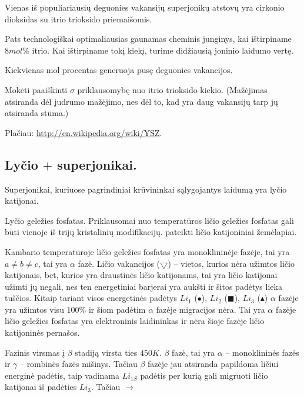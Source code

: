 \begin{remember}
  \item Vienas iš populiariausių deguonies vakansijų superjonikų
    atstovų yra cirkonio dioksidas su itrio trioksido priemaišomis.
  \item Pats technologiškai optimaliausias gaunamas cheminis
    junginys, kai ištirpiname $8 mol \%$ itrio. Kai ištirpiname tokį
    kiekį, turime didžiausią joninio laidumo vertę.
  \item Kiekvienas mol procentas generuoja pusę deguonies vakancijos.
  \item Mokėti paaiškinti $\sigma$ priklausomybę nuo itrio trioksido
    kiekio. (Mažėjimas atsiranda dėl judrumo mažėjimo, nes dėl
    to, kad yra daug vakansijų tarp jų atsiranda stūma.)
\end{remember}

Plačiau: \url{http://en.wikipedia.org/wiki/YSZ}.

\subsection{Lyčio $+$ superjonikai.}

Superjonikai, kuriuose pagrindiniai krūvininkai sąlygojantys laidumą
yra lyčio katijonai.

Lyčio geležies fosfatas. Priklausomai nuo temperatūros ličio geležies
fosfatas gali būti vienoje iš trijų kristalinių modifikacijų.
 pateikti ličio katijoniniai žemėlapiai.

Kambario temperatūroje ličio geležies fosfatas yra monoklininėje
fazėje, tai yra $a \neq b \neq c$, tai yra $\alpha$ fazė.
Ličio vakancijos ($\bigtriangledown$) – vietos, kurios nėra užimtos
ličio katijonais, bet, kurios yra draustinės ličio katijonams, tai
yra ličio katijonai užimti jų negali, nes ten energetiniai barjerai
yra aukšti ir šitos padėtys lieka tuščios. Kitaip tariant visos
energetinės padėtys $Li_{1}$ ($\bullet$), $Li_{2}$ ($\blacksquare$),
$Li_{3}$ ($\blacktriangle$) $\alpha$ fazėje yra užimtos visu
100\% ir šiom padėtim $\alpha$ fazėje migracijos nėra. Tai yra
$\alpha$ fazėje ličio geležies fosfatas yra elektroninis
laidininkas ir nėra šioje fazėje ličio katijoninės pernašos.

Fazinis virsmas į $\beta$ stadiją virsta ties $450 K$. $\beta$ fazė,
tai yra $\alpha$ – monoklininės fazės ir $\gamma$ – rombinės fazės
mišinys. Tačiau $\beta$ fazėje jau atsiranda papildoma ličiui
energinė padėtis, taip vadinama $Li_{1S}$ padėtis per kurią gali
migruoti ličio katijonai iš padėties $Li_{3}$. Tačiau \sun $\to$
\textdied

